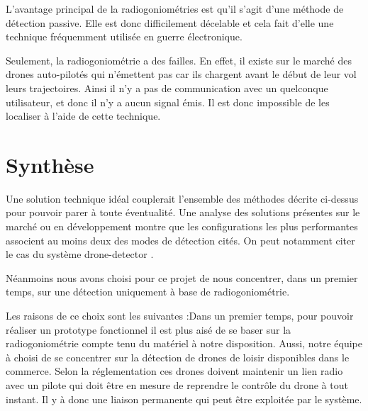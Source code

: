 L'avantage principal de la radiogoniométries est qu'il s'agit d'une méthode de détection passive. Elle est donc difficilement décelable et cela fait d'elle une technique fréquemment utilisée en guerre électronique. 

Seulement, la radiogoniométrie a des failles. En effet, il existe sur le marché des drones auto-pilotés qui n'émettent pas car ils chargent avant le début de leur vol leurs trajectoires. Ainsi il n'y a pas de communication avec un quelconque utilisateur, et donc il n'y a aucun signal émis. Il est donc impossible de les localiser à l'aide de cette technique.





\section{Synthèse}

Une solution technique idéal couplerait l'ensemble des méthodes décrite ci-dessus pour pouvoir parer à toute éventualité. Une analyse des solutions présentes sur le marché ou en développement montre que les configurations les plus performantes associent au moins deux des modes de détection cités. On peut notamment citer le cas du système drone-detector \cite{dronedetector}.

Néanmoins nous avons choisi pour ce projet de nous concentrer, dans un premier temps, sur une détection uniquement à base de radiogoniométrie.

Les raisons de ce choix sont les suivantes :Dans un premier temps, pour pouvoir réaliser un prototype fonctionnel il est plus aisé de se baser sur la radiogoniométrie compte tenu du matériel à notre disposition. 
Aussi, notre équipe à choisi de se concentrer sur la détection de drones de loisir disponibles dans le commerce. Selon la réglementation ces drones doivent maintenir un lien radio avec un pilote qui doit être en mesure de reprendre le contrôle du drone à tout instant. Il y à donc une liaison permanente qui peut être exploitée par le système.







